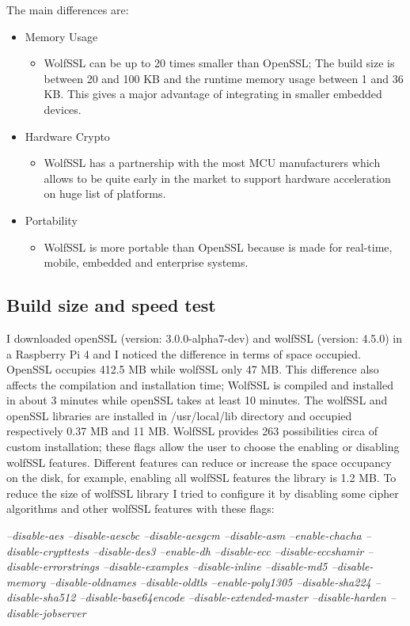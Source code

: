 \documentclass[a4paper,12pt]{article}
\begin{document}
The main differences are:
\begin{itemize}
\item Memory Usage
\begin{itemize}
\item WolfSSL can be up to 20 times smaller than OpenSSL; The build size is between 20 and 100 KB and the runtime memory usage between 1 and 36 KB. This gives a major advantage of integrating in smaller embedded devices. 
\end{itemize}
\item Hardware Crypto
\begin{itemize}
\item WolfSSL has a partnership with the most MCU manufacturers which allows to be quite early in the market to support hardware acceleration on huge list of platforms.
\end{itemize}
\item Portability
\begin{itemize}
\item WolfSSL is more portable than OpenSSL because is made for real-time, mobile, embedded and enterprise systems.
\end{itemize}
\end{itemize}

\subsection{Build size and speed test}
I downloaded openSSL (version: 3.0.0-alpha7-dev) and wolfSSL (version: 4.5.0) in a Raspberry Pi 4 and I noticed the difference in terms of space occupied.
OpenSSL occupies 412.5 MB while wolfSSL only 47 MB. This difference also affects the compilation and installation time; WolfSSL is compiled and installed in about 3 minutes while openSSL takes at least 10 minutes.
The wolfSSL and openSSL libraries are installed in /usr/local/lib directory and occupied respectively 0.37 MB and 11 MB.
WolfSSL provides 263 possibilities circa of custom installation; these flags allow the user to choose the enabling or disabling wolfSSL features. Different features can reduce or increase the space occupancy on the disk, for example, enabling all wolfSSL features the library is 1.2 MB.
To reduce the size of wolfSSL library I tried to configure it by disabling some cipher algorithms and other wolfSSL features with these flags:

\textit{--disable-aes --disable-aescbc --disable-aesgcm --disable-asm --enable-chacha --disable-crypttests --disable-des3 --enable-dh --disable-ecc --disable-eccshamir --disable-errorstrings --disable-examples --disable-inline --disable-md5 --disable-memory --disable-oldnames --disable-oldtls --enable-poly1305 --disable-sha224 --disable-sha512 --disable-base64encode --disable-extended-master --disable-harden --disable-jobserver}
\end{document}
